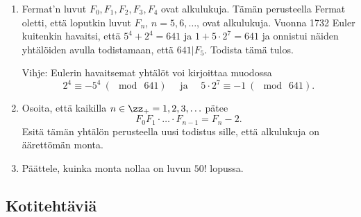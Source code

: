 \begin{enumerate}
\item Fermat'n luvut $F_0, F_1, F_2, F_3, F_4$ ovat alkulukuja. Tämän perusteella Fermat oletti, että loputkin luvut $F_n$, $n=5, 6, \ldots$, ovat alkulukuja. Vuonna 1732 Euler kuitenkin havaitsi, että $5^4 + 2^4 = 641$
ja $1 + 5\cdot 2^7 = 641$ ja onnistui näiden yhtälöiden avulla todistamaan, että $641 | F_5$. Todista tämä tulos.

Vihje: Eulerin havaitsemat yhtälöt voi kirjoittaa muodossa
\[
2^4 \equiv -5^4\ (\mod\ 641)\quad\text{ ja }\quad5\cdot 2^7 \equiv -1\ (\mod\ 641).
\]

\item  Osoita, että kaikilla $n\in\zz_{+}=1, 2, 3, \ldots$ pätee
\[
F_{0}F_{1}\cdot \ldots \cdot F_{n-1} = F_{n} - 2.
\]
Esitä tämän yhtälön perusteella uusi todistus sille,
että alkulukuja on äärettömän monta.

\item Päättele, kuinka monta nollaa on luvun $50!$ lopussa.

\end{enumerate}

\subsection*{Kotitehtäviä}

